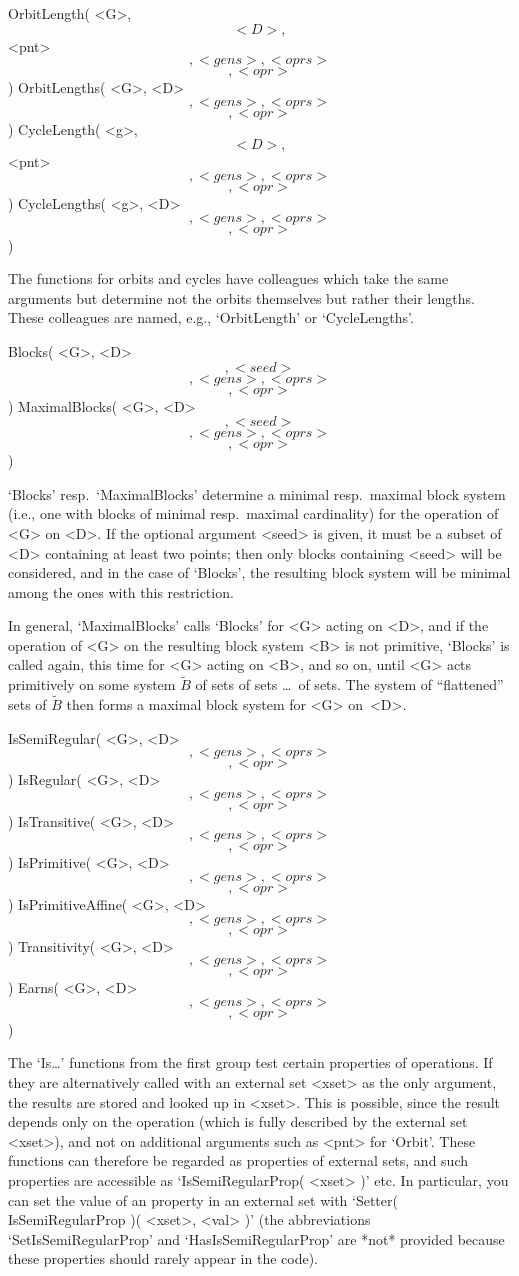 \>OrbitLength( <G>, \[ <D>, \] <pnt> \[, <gens>, <oprs> \] \[, <opr> \] )
\>OrbitLengths( <G>, <D> \[, <gens>, <oprs> \] \[, <opr> \] )
%
\>CycleLength( <g>, \[ <D>, \] <pnt> \[, <gens>, <oprs> \] \[, <opr> \] )
\>CycleLengths( <g>, <D> \[, <gens>, <oprs> \] \[, <opr> \] )

The functions  for orbits and cycles  have colleagues which take the same
arguments but   determine  not the orbits   themselves  but rather  their
lengths.    These   colleagues   are   named,   e.g.,   `OrbitLength'  or
`CycleLengths'.

\>Blocks( <G>, <D> \[, <seed> \] \[, <gens>, <oprs> \] \[, <opr> \] )
\>MaximalBlocks( <G>, <D> \[, <seed> \] \[, <gens>, <oprs> \] %
                 \[, <opr> \] )

`Blocks' resp.~`MaximalBlocks'  determine  a minimal  resp.~maximal block
system (i.e., one with  blocks of minimal resp.~maximal cardinality)  for
the operation of <G> on <D>. If the optional argument <seed> is given, it
must be a subset of <D> containing at  least two points; then only blocks
containing <seed> will  be considered, and in  the case of  `Blocks', the
resulting   block  system will  be  minimal    among the ones   with this
restriction.

In general, `MaximalBlocks' calls `Blocks' for  <G> acting on <D>, and if
the operation of <G> on the resulting  block system <B> is not primitive,
`Blocks'  is called again, this  time for <G> acting   on <B>, and so on,
until <G> acts  primitively  on some system $\tilde   B$ of sets of  sets
\dots\ of sets. The system of ``flattened'' sets of $\tilde B$ then forms
a maximal block system for <G> on~<D>.

\>IsSemiRegular( <G>, <D> \[, <gens>, <oprs> \] \[, <opr> \] )
%
\>IsRegular( <G>, <D> \[, <gens>, <oprs> \] \[, <opr> \] )
%
\>IsTransitive( <G>, <D> \[, <gens>, <oprs> \] \[, <opr> \] )
%
\>IsPrimitive( <G>, <D> \[, <gens>, <oprs> \] \[, <opr> \] )
%
\>IsPrimitiveAffine( <G>, <D> \[, <gens>, <oprs> \] \[, <opr> \] )
\endgraf\smallskip%
\>Transitivity( <G>, <D> \[, <gens>, <oprs> \] \[, <opr> \] )
%
\>Earns( <G>, <D> \[, <gens>, <oprs> \] \[, <opr> \] )
%

The `Is\dots' functions  from the first  group test certain properties of
operations. If they are alternatively called  with an external set <xset>
as the only argument,  the results  are stored and  looked up  in <xset>.
This is  possible, since the result  depends only on the operation (which
is fully  described  by the external  set <xset>),  and not on additional
arguments such  as <pnt>  for `Orbit'. These  functions can  therefore be
regarded  as properties of external  sets, and such {\GAP} properties are
accessible as `IsSemiRegularProp( <xset>  )' etc. In particular, you  can
set  the   value of an   property   in  an  external   set with  `Setter(
IsSemiRegularProp   )(    <xset>,    <val>    )'   (the     abbreviations
`SetIsSemiRegularProp'  and  `HasIsSemiRegularProp'  are   *not* provided
because these properties should rarely appear in the code).

